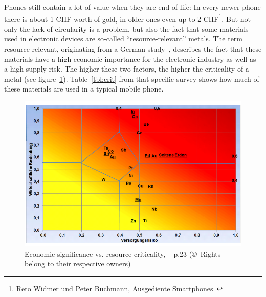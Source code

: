 \documentclass[11pt]{scrartcl}
\begin{document}
Phones still contain a lot of value when they are end-of-life: In every newer phone there is about 1 CHF worth of gold, in older ones even up to 2 CHF\footnote{Reto Widmer und Peter Buchmann, Ausgediente Smartphones~\cite{SRF}}. But not only the lack of circularity is a problem, but also the fact that some materials used in electronic devices are so-called ``resource-relevant'' metals. The term resource-relevant, originating from a German study~\cite{Studie}, describes the fact that these materials have a high economic importance for the electronic industry as well as a high supply risk. The higher these two factors, the higher the criticality of a metal (see figure~\ref{fig:crit}). Table~\ref{tbl:crit} from that specific survey shows how much of these materials are used in a typical mobile phone.

%
\begin{figure} [H]
    \includegraphics[width=\textwidth]{img/criticality}
    \caption{Economic significance vs. resource criticality, ~\cite{Studie} p.23 (\copyright~Rights belong to their respective owners)}%
    \label{fig:crit}
\end{figure}
%
\end{document}

